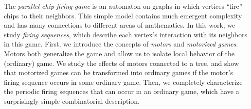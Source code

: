 The \emph{parallel chip-firing game} is an automaton on graphs in which
vertices ``fire'' chips to their neighbors. This simple model contains much
emergent complexity and has many connections to different areas of
mathematics. In this work, we study \emph{firing sequences}, which describe
each vertex's interaction with its neighbors in this game. First, we introduce
the concepts of \emph{motors} and \emph{motorized games}. Motors both
generalize the game and allow us to isolate local behavior of the (ordinary)
game. We study the effects of motors connected to a tree, and show that
motorized games can be transformed into ordinary games if the motor's firing
sequence occurs in some ordinary game. Then, we completely characterize the
periodic firing sequences that can occur in an ordinary game, which have a
surprisingly simple combinatorial description.
